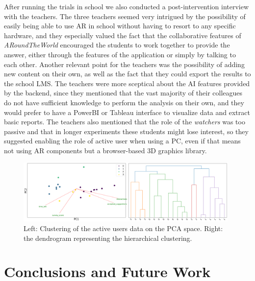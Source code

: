 \documentclass[pdflatex,sn-basic,iicol]{sn-jnl}%
\def\appname/{\textit{ARoundTheWorld}}
\begin{document}
After running the trials in school we also conducted a post-intervention interview with the teachers. The three teachers seemed very intrigued by the possibility of easily being able to use AR in school without having to resort to any specific hardware, and they especially valued the fact that the collaborative features of \appname/ encouraged the students to work together to provide the answer, either through the features of the application or simply by talking to each other. Another relevant point for the teachers was the possibility of adding new content on their own, as well as the fact that they could export the results to the school LMS. The teachers were more sceptical about the AI features provided by the backend, since they mentioned that the vast majority of their colleagues do not have sufficient knowledge to perform the analysis on their own, and they would prefer to have a PowerBI or Tableau interface to visualize data and extract basic reports. The teachers also mentioned that the role of the \textit{watchers} was too passive and that in longer experiments these students might lose interest, so they suggested enabling the role of active user when using a PC, even if that means not using AR components but a browser-based 3D graphics library.

\begin{figure}[htbp]
    \centering
    \includegraphics[width=0.98\textwidth]{imgs/unsup_3.png}
    \caption{Left: Clustering of the active users data on the PCA space. Right: the dendrogram representing the hierarchical clustering.}
    \label{fig:clustering}
\end{figure}

\section{Conclusions and Future Work}\label{sec:conclusion}
\end{document}
